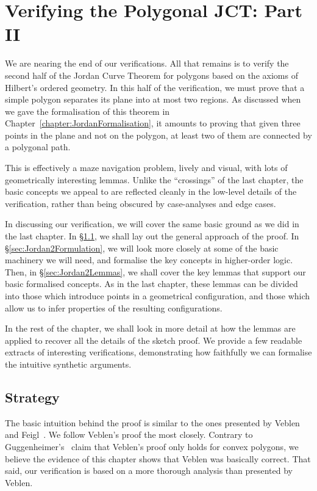 \chapter{Verifying the Polygonal JCT: Part II}\label{chapter:JordanVerification2}
We are nearing the end of our verifications. All that remains is to verify the second half of the Jordan Curve Theorem for polygons based on the axioms of Hilbert's ordered geometry. In this half of the verification, we must prove that a simple polygon separates its plane into at most two regions. As discussed when we gave the formalisation of this theorem in Chapter~\ref{chapter:JordanFormalisation}, it amounts to proving that given three points in the plane and not on the polygon, at least two of them are connected by a polygonal path.

This is effectively a maze navigation problem, lively and visual, with lots of geometrically interesting lemmas. Unlike the ``crossings'' of the last chapter, the basic concepts we appeal to are reflected cleanly in the low-level details of the verification, rather than being obscured by case-analyses and edge cases.

In discussing our verification, we will cover the same basic ground as we did in the last chapter. In \S\ref{sec:SketchProofJordan2}, we shall lay out the general approach of the proof. In \S\ref{sec:Jordan2Formulation}, we will look more closely at some of the basic machinery we will need, and formalise the key concepts in higher-order logic. Then, in \S\ref{sec:Jordan2Lemmas}, we shall cover the key lemmas that support our basic formalised concepts. As in the last chapter, these lemmas can be divided into those which introduce points in a geometrical configuration, and those which allow us to infer properties of the resulting configurations. 

In the rest of the chapter, we shall look in more detail at how the lemmas are applied to recover all the details of the sketch proof. We provide a few readable extracts of interesting verifications, demonstrating how faithfully we can formalise the intuitive synthetic arguments.

\section{Strategy}\label{sec:SketchProofJordan2}
The basic intuition behind the proof is similar to the ones presented by Veblen~\cite{Veblenphd} and Feigl~\cite{FeiglJordan}. We follow Veblen's proof the most closely. Contrary to Guggenheimer's~\cite{GuggenheimerJordanCurve} claim that Veblen's proof only holds for convex polygons, we believe the evidence of this chapter shows that Veblen was basically correct. That said, our verification is based on a more thorough analysis than presented by Veblen.

